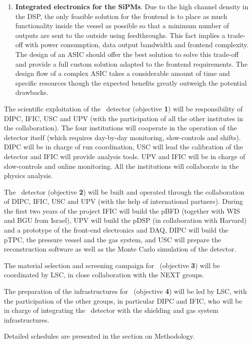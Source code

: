 \begin{enumerate}
\item {\bf Integrated electronics for the SiPMs}. Due to the high channel density in the DSP, the only feasible solution for the frontend is to place as much functionality inside the vessel as possible so that a minimum number of outputs are sent to the outside using feedthroughs. This fact implies a trade-off with power consumption, data output bandwidth and frontend complexity. The design of an ASIC should offer the best solution to solve this trade-off and provide a full custom solution adapted to the frontend requirements. The design flow of a complex ASIC takes a considerable amount of time and specific resources though the expected benefits greatly outweigh the potential drawbacks.
\end{enumerate}


The scientific exploitation of the \Next\ detector (objective {\bf 1}) will be responsibility of DIPC, IFIC,  USC and UPV (with the participation of all the other institutes in the collaboration). The four institutions will cooperate in the operation of the detector itself (which requires day-by-day monitoring, slow-controls and shifts). DIPC will be in charge of run coordination, USC will lead the calibration of the detector and IFIC will provide analysis tools. UPV and IFIC will be in charge of slow-controls and online monitoring. All the institutions will collaborate in the physics analysis.  


The \HDEMO\ detector (objective {\bf 2}) will be built and operated through the collaboration of DIPC, IFIC, USC and UPV (with the help of international partners). 
During the first two years of the project IFIC will build the pBFD (together with WIS and BGU from Israel), UPV will build the pDSP (in collaboration with Harvard) and a prototype of the front-end electronics and DAQ, DIPC will build the pTPC, the pressure vessel and the gas system, and USC will prepare the reconstruction software as well as the Monte Carlo simulation of the detector. 

The material selection and screening campaign for \NHD\ (objective {\bf 3})  will be coordinated by LSC, in close collaboration with the NEXT groups. 

The preparation of the infrastructures for \NHD\ (objective {\bf 4})  will be led by LSC, with the participation of the other groups, in particular DIPC and IFIC, who will be in charge of integrating the \NHD\ detector with the shielding and gas system infrastructures.

Detailed schedules are presented in the section on Methodology.  
  